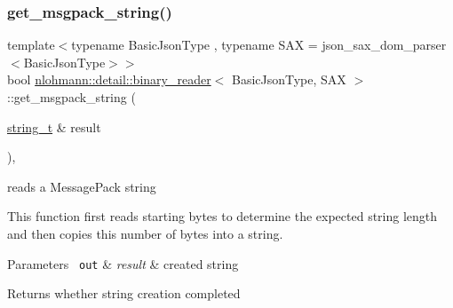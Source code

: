 \subsubsection{\texorpdfstring{get\_msgpack\_string()}{get\_msgpack\_string()}}
{\footnotesize\ttfamily template$<$typename Basic\+Json\+Type , typename S\+AX  = json\+\_\+sax\+\_\+dom\+\_\+parser$<$\+Basic\+Json\+Type$>$$>$ \\
bool \mbox{\hyperlink{classnlohmann_1_1detail_1_1binary__reader}{nlohmann\+::detail\+::binary\+\_\+reader}}$<$ Basic\+Json\+Type, S\+AX $>$\+::get\+\_\+msgpack\+\_\+string (\begin{DoxyParamCaption}\item[{\mbox{\hyperlink{classnlohmann_1_1detail_1_1binary__reader_aa0b9729917ca7ee6ed01e3792341316e}{string\+\_\+t}} \&}]{result }\end{DoxyParamCaption})\hspace{0.3cm}{\ttfamily [inline]}, {\ttfamily [private]}}



reads a Message\+Pack string 

This function first reads starting bytes to determine the expected string length and then copies this number of bytes into a string.


\begin{DoxyParams}[1]{Parameters}
\mbox{\texttt{ out}}  & {\em result} & created string\\
\hline
\end{DoxyParams}
\begin{DoxyReturn}{Returns}
whether string creation completed 
\end{DoxyReturn}
\mbox{\label{classnlohmann_1_1detail_1_1binary__reader_a161cda5919ea2436b7999c2a76656aba}} 
